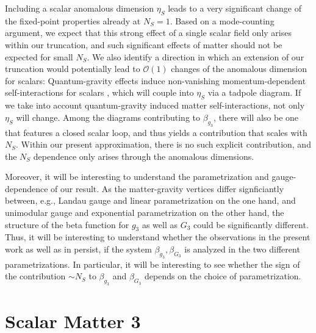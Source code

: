 \documentclass[11pt]{book} %
\begin{document}
Including a scalar anomalous dimension $\eta_S$ leads to a very significant change
of the fixed-point properties already at $N_S=1$.
Based on a mode-counting argument, we
expect that this strong effect of a single scalar field only arises within our truncation,
and such significant effects of matter should not be expected for small $N_S$.
We also identify a direction in which an extension of our truncation would potentially
lead to $\mathcal{O}(1)$ changes of the anomalous dimension for scalars:
Quantum-gravity effects induce non-vanishing momentum-dependent self-interactions
for scalars \cite{Eichhorn:2012va}, which will couple into $\eta_S$ via a tadpole diagram.
If we take into account quantum-gravity induced matter self-interactions, not only $\eta_S$ will change.
Among the diagrams contributing to $\beta_{g_3}$,
there will also be one that features a closed scalar loop,
and thus yields a contribution that scales with $N_S$. Within our present approximation,
there is no such explicit contribution, and the $N_S$ dependence only arises through the anomalous dimensions.

Moreover, it will be interesting to understand the parametrization and gauge-dependence of our result.
As the matter-gravity vertices differ signficiantly between,
e.g., Landau gauge and linear parametrization on the one hand,
and unimodular gauge and exponential parametrization on the other hand,
the structure of the beta function for $g_3$ as well as $G_3$ could be significantly different.
Thus, it will be interesting to understand whether the observations in the present work as
well as in \cite{Meibohm:2015twa} persist,
if the system $\beta_{g_3}, \beta_{G_3}$ is analyzed in the two different parametrizations.
In particular, it will be interesting to see whether the sign of the contribution
$\sim N_S$ to $\beta_{g_3}$ and $\beta_{G_3}$ depends on the choice of parametrization.



\chapter{Scalar Matter 3}
\end{document}
